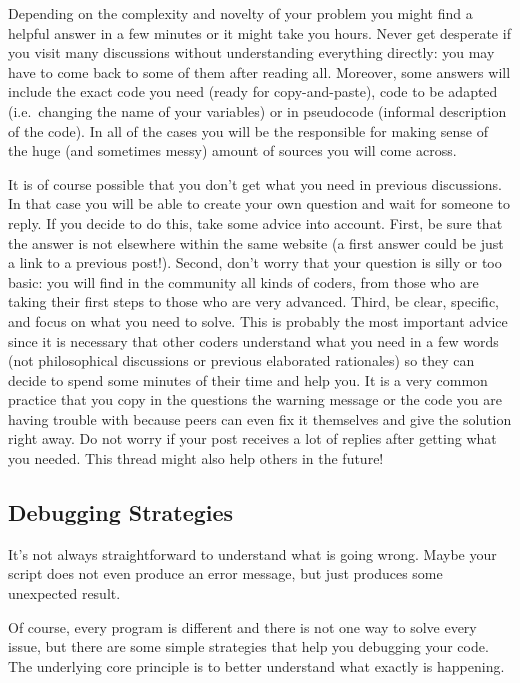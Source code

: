 Depending on the complexity and novelty of your problem you might  find a helpful answer in a few minutes or it might take you hours. Never get desperate if you visit many discussions without understanding everything directly: you may have to come back to some of them after reading all. Moreover, some answers will include the exact code you need (ready for copy-and-paste), code to be adapted (i.e.\ changing the name of your variables) or in pseudocode (informal description of the code). In all of the cases you will be the responsible for making sense of the huge (and sometimes messy) amount of sources you will come across.

It is of course possible that you don't get what you need in previous discussions. In that case you will be able to create your own question and wait for someone to reply. If you decide to do this, take some advice into account. First, be sure that the answer is not elsewhere within the same website (a first answer could be just a link to a previous post!). Second, don't worry that your question is silly or too basic: you will find in the community all kinds of coders, from those who are taking their first steps to those who are very advanced. Third, be clear, specific, and focus on what you need to solve. This is probably the most important advice since it is necessary that other coders understand what you need in a few words (not philosophical discussions or previous elaborated rationales)  so they can decide to spend some minutes of their time and help you. It is a very common practice that you copy in the questions the warning message or the code you are having trouble with because peers can even fix it themselves and give the solution right away. Do not worry if your post receives a lot of replies after getting what you needed. This thread might also help others in the future!


\subsection{Debugging Strategies}

It's not always straightforward to understand what is going
wrong. Maybe your script does not even produce an error
message, but just produces some unexpected result.

Of course, every program is different and there is not one
way to solve every issue, but there are some simple strategies
that help you debugging your code. The underlying core
principle is to better understand what exactly is happening.

